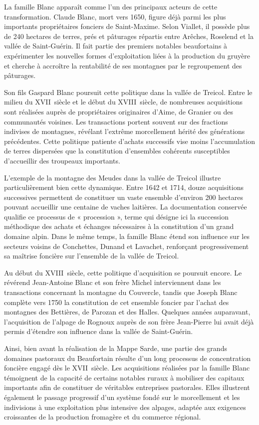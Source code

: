 \documentclass[12pt,a4paper]{report}
\begin{document}
	La famille Blanc apparaît comme l'un des principaux acteurs de cette transformation. Claude Blanc, mort vers 1650, figure déjà parmi les plus importants propriétaires fonciers de Saint-Maxime. Selon Viallet, il possède plus de 240 hectares de terres, prés et pâturages répartis entre Arêches, Roselend et la vallée de Saint-Guérin. Il fait partie des premiers notables beaufortains à expérimenter les nouvelles formes d'exploitation liées à la production du gruyère et cherche à accroître la rentabilité de ses montagnes par le regroupement des pâturages.
	
	Son fils Gaspard Blanc poursuit cette politique dans la vallée de Treicol. Entre le milieu du XVII\ieme\ siècle et le début du XVIII\ieme\ siècle, de nombreuses acquisitions sont réalisées auprès de propriétaires originaires d'Aime, de Granier ou des communautés voisines. Les transactions portent souvent sur des fractions indivises de montagnes, révélant l'extrême morcellement hérité des générations précédentes. Cette politique patiente d'achats successifs vise moins l'accumulation de terres dispersées que la constitution d'ensembles cohérents susceptibles d'accueillir des troupeaux importants.
	
	L'exemple de la montagne des Meudes dans la vallée de Treicol illustre particulièrement bien cette dynamique. Entre 1642 et 1714, douze acquisitions successives permettent de constituer un vaste ensemble d'environ 200 hectares pouvant accueillir une centaine de vaches laitières. La documentation conservée qualifie ce processus de « procession », terme qui désigne ici la succession méthodique des achats et échanges nécessaires à la constitution d'un grand domaine alpin. Dans le même temps, la famille Blanc étend son influence sur les secteurs voisins de Conchettes, Dunand et Lavachet, renforçant progressivement sa maîtrise foncière sur l'ensemble de la vallée de Treicol.
	
	Au début du XVIII\ieme\ siècle, cette politique d'acquisition se poursuit encore. Le révérend Jean-Antoine Blanc et son frère Michel interviennent dans les transactions concernant la montagne du Couvercle, tandis que Joseph Blanc complète vers 1750 la constitution de cet ensemble foncier par l'achat des montagnes des Bettières, de Parozan et des Halles. Quelques années auparavant, l'acquisition de l'alpage de Rognoux auprès de son frère Jean-Pierre lui avait déjà permis d'étendre son influence dans la vallée de Saint-Guérin.
	
	Ainsi, bien avant la réalisation de la Mappe Sarde, une partie des grands domaines pastoraux du Beaufortain résulte d'un long processus de concentration foncière engagé dès le XVII\ieme\ siècle. Les acquisitions réalisées par la famille Blanc témoignent de la capacité de certains notables ruraux à mobiliser des capitaux importants afin de constituer de véritables entreprises pastorales. Elles illustrent également le passage progressif d'un système fondé sur le morcellement et les indivisions à une exploitation plus intensive des alpages, adaptée aux exigences croissantes de la production fromagère et du commerce régional.
	
\end{document}
